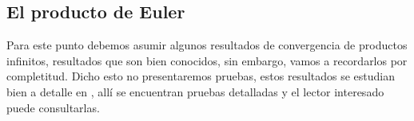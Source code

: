\subsection{El producto de Euler}

Para este punto debemos asumir algunos resultados de convergencia de productos infinitos, resultados que son bien conocidos, sin embargo, vamos a recordarlos por completitud. Dicho esto no presentaremos pruebas, estos resultados se estudian bien a detalle en \cite{Apostol:105425}, allí se encuentran pruebas detalladas y el lector interesado puede consultarlas.



